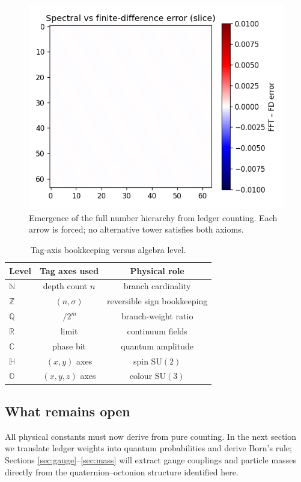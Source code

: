 \begin{figure}[t]
  \centering
  \includegraphics[width=\linewidth]{figs/number_tower.png}
  \caption{Emergence of the full number hierarchy from ledger counting.
           Each arrow is forced; no alternative tower satisfies both axioms.}
  \label{fig:number-tower}
\end{figure}

\begin{table}[b]
  \centering
  \begin{tabular}{lcc}
    \hline
    Level & Tag axes used & Physical role \\
    \hline
    $\mathbb N$ & depth count $n$ & branch cardinality \\[2pt]
    $\mathbb Z$ & $(n,\sigma)$ & reversible sign bookkeeping \\[2pt]
    $\mathbb Q$ & $\,/2^m$ & branch-weight ratio \\[2pt]
    $\mathbb R$ & limit & continuum fields \\[2pt]
    $\mathbb C$ & phase bit & quantum amplitude \\[2pt]
    $\mathbb H$ & $(x,y)$ axes & spin $\mathrm{SU}(2)$ \\[2pt]
    $\mathbb O$ & $(x,y,z)$ axes & colour $\mathrm{SU}(3)$ \\
    \hline
  \end{tabular}
  \caption{Tag-axis bookkeeping versus algebra level.}
  \label{tab:number-levels}
\end{table}

\subsection{What remains open}

All physical constants must now derive from pure counting.  In the next
section we translate ledger weights into quantum probabilities and derive
Born’s rule; Sections \ref{sec:gauge}–\ref{sec:mass} will extract gauge
couplings and particle masses directly from the quaternion–octonion
structure identified here.

\clearpage
